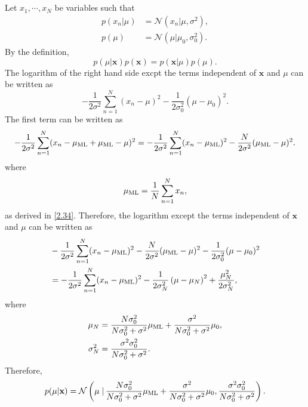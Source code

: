 \subsection{}
\label{2.38}
Let $x_1, \cdots, x_N$ be variables such that
%
\begin{equation}
\begin{aligned}
p(x_n | \mu)
&=
\mathcal{N}
\left(
	x_n
	|
	\mu,
	\sigma ^ 2	
\right),
\\
p(\mu)
&=
\mathcal{N}
\left(
	\mu
	|
	\mu_0,
	\sigma_0 ^ 2	
\right).
\end{aligned}
\end{equation}
%
By the definition,
%
\begin{equation}
p(\mu | \mathbf{x})
p(\mathbf{x})
=
p(\mathbf{x} | \mu)
p(\mu).
\end{equation}
%
The logarithm of the right hand side excpt the terms independent of $\mathbf{x}$ and $\mu$ can be written as
%
\begin{equation}
-
\frac{1}{2 \sigma ^ 2}
\sum_{n = 1}^{N}
(x_n - \mu) ^ 2
-
\frac{1}{2 \sigma_0 ^ 2}
(\mu - \mu_0) ^ 2.
\end{equation}
%
The first term can be written as
%
\begin{equation}
-
\frac{1}{2 \sigma ^ 2}
\sum_{n = 1}^{N}
(x_n - \mu_{\rm ML} + \mu_{\rm ML} - \mu) ^ 2
=
-
\frac{1}{2 \sigma ^ 2}
\sum_{n = 1}^{N}
(x_n - \mu_{\rm ML}) ^ 2
-
\frac{N}{2 \sigma ^ 2}
(\mu_{\rm ML} - \mu) ^ 2.
\end{equation}
%
where
%
\begin{equation}
\mu_{\rm ML}
=
\frac{1}{N}
\sum_{n = 1}^{N}
x_n,
\end{equation}
%
as derived in \ref{2.34}.
Therefore, the logarithm except the terms independent of $\mathbf{x}$ and $\mu$ can be written as
%
\begin{equation}
\begin{aligned}
&-
\frac{1}{2 \sigma ^ 2}
\sum_{n = 1}^{N}
(x_n - \mu_{\rm ML}) ^ 2
-
\frac{N}{2 \sigma ^ 2}
(\mu_{\rm ML} - \mu) ^ 2
-
\frac{1}{2 \sigma_0 ^ 2}
(\mu - \mu_0) ^ 2 
\\
&=
-
\frac{1}{2 \sigma ^ 2}
\sum_{n = 1}^{N}
(x_n - \mu_{\rm ML}) ^ 2
-
\frac{1}{2 \sigma_N ^ 2}
\left(
	\mu
	-
	\mu_N	
\right) ^ 2
+
\frac{\mu_N ^ 2}{2 \sigma_N ^ 2},
\end{aligned}
\end{equation}
%
where
%
\begin{equation}
\begin{aligned}
\mu_N
&= 
\frac{N \sigma_0 ^ 2}{N \sigma_0 ^ 2 + \sigma ^ 2} 
\mu_{\rm ML} 
+
\frac{\sigma ^ 2}{N \sigma_0 ^ 2 + \sigma ^ 2} 
\mu_0,
\\
\sigma_N ^ 2
&= 
\frac{\sigma ^ 2 \sigma_0 ^ 2}{N \sigma_0 ^ 2 + \sigma ^ 2}.
\end{aligned}
\end{equation}
%
Therefore,
%
\begin{equation}
p(\mu | \mathbf{x})
= 
\mathcal{N}
\left( 
	\mu
	\left.
	\right \vert
	\frac{N \sigma_0 ^ 2}{N \sigma_0 ^ 2 + \sigma ^ 2} 
	\mu_{\rm ML} 
	+
	\frac{\sigma ^ 2}{N \sigma_0 ^ 2 + \sigma ^ 2} 
	\mu_0,
	\frac{\sigma ^ 2 \sigma_0 ^ 2}{N \sigma_0 ^ 2 + \sigma ^ 2}
\right).
\end{equation}
%


